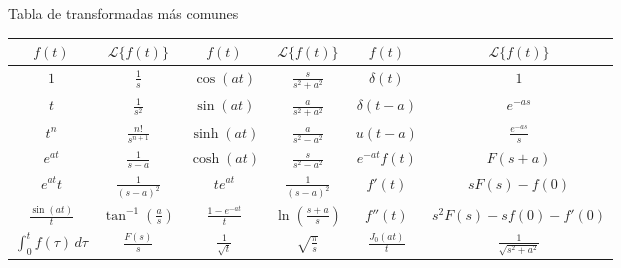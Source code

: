 \documentclass[9pt, aspectratio=169]{beamer}
\begin{document}
\begin{frame}{Tabla de transformadas más comunes}
\begin{center}
\begin{tabular}{cccccc}
  \toprule
\( f(t) \) & \( \mathcal{L}\{f(t)\} \) & \( f(t) \) & \( \mathcal{L}\{f(t)\} \) & \( f(t) \) & \( \mathcal{L}\{f(t)\} \) \\
\midrule
\( 1 \) & \( \frac{1}{s} \) & \( \cos(at) \) & \( \frac{s}{s^2 + a^2} \) & \( \delta(t) \) & \( 1 \) \\
\( t \) & \( \frac{1}{s^2} \) & \( \sin(at) \) & \( \frac{a}{s^2 + a^2} \) & \( \delta(t - a) \) & \( e^{-as} \) \\
\( t^n \) & \( \frac{n!}{s^{n+1}} \) & \( \sinh(at) \) & \( \frac{a}{s^2 - a^2} \) & \( u(t - a) \) & \( \frac{e^{-as}}{s} \) \\
\( e^{at} \) & \( \frac{1}{s - a} \) & \( \cosh(at) \) & \( \frac{s}{s^2 - a^2} \) & \( e^{-at}f(t) \) & \( F(s + a) \) \\
\( e^{at}t \) & \( \frac{1}{(s - a)^2} \) & \( t e^{at} \) & \( \frac{1}{(s - a)^2} \) & \( f'(t) \) & \( sF(s) - f(0) \) \\
\( \frac{\sin(at)}{t} \) & \( \tan^{-1}\left( \frac{a}{s} \right) \) & \( \frac{1 - e^{-at}}{t} \) & \( \ln\left( \frac{s + a}{s} \right) \) & \( f''(t) \) & \( s^2 F(s) - sf(0) - f'(0) \) \\
\( \int_0^t f(\tau)\, d\tau \) & \( \frac{F(s)}{s} \) & \( \frac{1}{\sqrt{t}} \) & \( \sqrt{\frac{\pi}{s}} \) & \( \frac{J_0(at)}{t} \) & \( \frac{1}{\sqrt{s^2 + a^2}} \) \\
\bottomrule
\end{tabular}
\end{center}
\end{frame}
\end{document}
